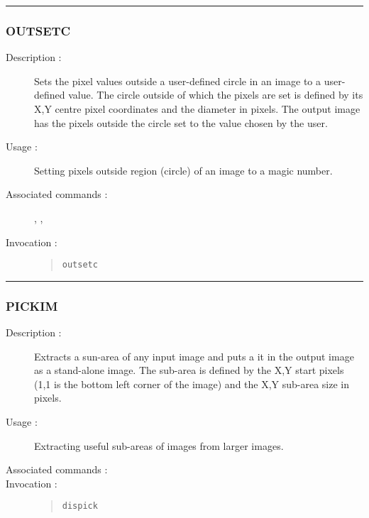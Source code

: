 \hrule 
\subsubsection*{\label{OUTSETC}OUTSETC}

\begin{description}

\item[Description :] Sets the pixel values outside a user-defined
circle in an image to a user-defined value.  The circle outside of
which the pixels are set is defined by its X,Y centre pixel coordinates
and the diameter in pixels.  The output image has the pixels outside
the circle set to the value chosen by the user.

\item[Usage :] Setting pixels outside region (circle) of an image to a
magic number.

\item[Associated commands :] {\tt {}}, 
{\tt {}}, {\tt {}}

\item[Invocation :]

\begin{quote}{\tt  outsetc }\end{quote}

\end{description}

\hrule 
\subsubsection*{\label{PICKIM}PICKIM}

\begin{description}

\item[Description :] Extracts a sun-area of any input image and puts a
it in the output image as a stand-alone image.  The sub-area is defined
by the  X,Y start pixels (1,1 is the bottom left corner of the image)
and the X,Y sub-area size in pixels.

\item[Usage :] Extracting useful sub-areas of images from larger images.
\item[Associated commands :] {\tt {}}
\item[Invocation :]

\begin{quote}{\tt dispick }\end{quote}

\end{description}

